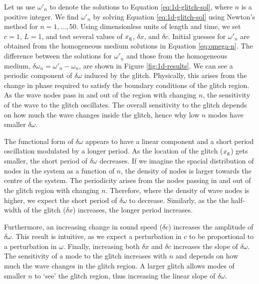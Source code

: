 Let us use \(\omega'_n\) to denote the solutions to Equation \ref{eq:1d-glitch-sol}, where \(n\) is a positive integer. We find \(\omega'_n\) by solving Equation \ref{eq:1d-glitch-sol} using Newton's method for \(n = 1,\dots,50\). Using dimensionless units of length and time, we set \(c=1\), \(L=1\), and test several values of \(x_{{\mathrm{g}}}\), \(\delta x\), and \(\delta c\). Initial guesses for \(\omega'_n\) are obtained from the homogeneous medium solutions in Equation \ref{eq:omega-n}. The difference between the solutions for \(\omega'_n\) and those from the homogeneous medium, \(\delta \omega_n = \omega'_n - \omega_n\), are shown in Figure \ref{fig:1d-results}. We can see a periodic component of \(\delta\omega\) induced by the glitch. Physically, this arises from the change in phase required to satisfy the boundary conditions of the glitch region. As the wave nodes pass in and out of the region with changing \(n\), the sensitivity of the wave to the glitch oscillates. The overall sensitivity to the glitch depends on how much the wave changes inside the glitch, hence why low \(n\) modes have smaller \(\delta\omega\).

The functional form of \(\delta\omega\) appears to have a linear component and a short period oscillation modulated by a longer period. As the location of the glitch (\(x_{{\mathrm{g}}}\)) gets smaller, the short period of \(\delta\omega\) decreases. If we imagine the spacial distribution of nodes in the system as a function of \(n\), the density of nodes is larger towards the centre of the system. The periodicity arises from the nodes passing in and out of the glitch region with changing \(n\). Therefore, where the density of wave nodes is higher, we expect the short period of \(\delta\omega\) to decrease. Similarly, as the the half-width of the glitch (\(\delta x\)) increases, the longer period increases. 

Furthermore, an increasing change in sound speed (\(\delta c\)) increases the amplitude of \(\delta\omega\). This result is intuitive, as we expect a perturbation in \(c\) to be proportional to a perturbation in \(\omega\). Finally, increasing both \(\delta x\) and \(\delta c\) increases the slope of \(\delta\omega\). The sensitivity of a mode to the glitch increases with \(n\) and depends on how much the wave changes in the glitch region. A larger glitch allows modes of smaller \(n\) to `see' the glitch region, thus increasing the linear slope of \(\delta\omega\).


